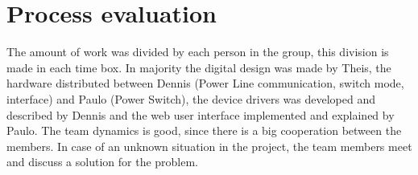 \chapter{Process evaluation}
The amount of work was divided by each person in the group, this division is made in each time box. In majority the digital design was made by Theis, the hardware distributed between Dennis (Power Line communication, switch mode, interface) and Paulo (Power Switch), the device drivers was developed and described by Dennis and the web user interface implemented and explained by Paulo.
\p
The team dynamics is good, since there is a big cooperation between the members. In case of an unknown situation in the project, the team members meet and discuss a solution for the problem.
